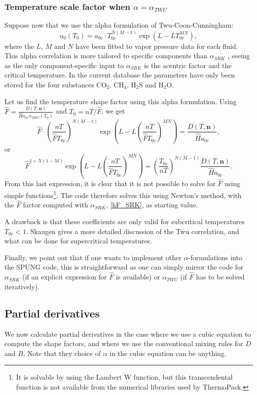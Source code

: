 \documentclass[english]{../thermomemo/thermomemo}
\newcommand{\mbn}[0]{\mathbf n}
\newcommand*{\hF}[0]{\hat F}
\newcommand*{\hH}[0]{\hat H}
\newcommand{\lp}{\left(}
\newcommand{\rp}{\right)}
\numberwithin{equation}{section}
\begin{document}
\subsubsection*{Temperature scale factor when $\alpha=\alpha_{TWU}$}
Suppose now that we use the alpha formulation of Twu-Coon-Cunningham:
$$
a_0(T_0) = a_{0c} \cdot T_{0r}^{N(M-1)} \exp \lp L - LT_{0r}^{MN} \rp,
$$
where the $L$, $M$ and $N$ have been fitted to vapor pressure data for
each fluid. This alpha correlation is more tailored to specific
components than $\alpha_{SRK}$ , seeing as the only component-specific
input to $\alpha_{SRK}$ is the acentric factor and the critical
temperature. In the current database the parameters have only been
stored for the four substances $\mathrm{CO}_2$, $\mathrm{CH}_4$,
$\mathrm{H}_2\mathrm{S}$ and $\mathrm{H}_2\mathrm{O}$.

Let us find the temperature shape factor using this alpha
formulation. Using $\hat F = \frac{D(T,\mbn)}{\hH
  a_{0c}\alpha_{TWU}(T_0)}$ and $T_0 = nT/\hF$, we get
$$
\hat F \cdot \lp \frac{nT}{\hF T_{0c}} \rp^{N(M-1)} \exp \lp L - L\lp \frac{nT}{\hF T_{0c}} \rp^{MN} \rp = \frac{D(T,\mbn)}{\hH
  a_{0c}},
$$
or
\begin{equation}
  \label{hF_TWU}
  \hF^{1+N(1-M)} \exp \lp L - L\lp \frac{nT}{\hF T_{0c}} \rp^{MN} \rp =
  \lp \frac{T_{0c}}{nT} \rp^{N(M-1)} \frac{D(T,\mbn)}{\hH a_{0c}}.
\end{equation}
From this last expression, it is clear that it is not possible to
solve for $\hF$ using simple functions\footnote{It is solvable by
  using the Lambert W function, but this transcendental function is
  not available from the numerical libraries used by ThermoPack.}.
The code therefore solves this using Newton's method, with the $\hF$
factor computed with $\alpha_{SRK}$, \eqref{hF_SRK}, as starting value.

A drawback is that these coefficients are only valid for subcritical
temperatures $T_{0r}<1$. Skaugen \cite{Skaugen13} gives a
more detailed discussion of the Twu correlation, and what can be done
for supercritical temperatures.

Finally, we point out that if one wants to implement other
$\alpha$-formulations into the SPUNG code, this is straightforward as
one can simply mirror the code for $\alpha_{SRK}$ (if an explicit
expression for $\hF$ is available) or $\alpha_{TWU}$ (if $\hF$ has to
be solved iteratively). 

\subsection{Partial derivatives} %
We now calculate partial derivatives in the case where we use a cubic
equation to compute the shape factors, and where we use the
conventional mixing rules for $D$ and $B$. Note that they choice of
$\alpha$ in the cubic equation can be anything.
\end{document}
